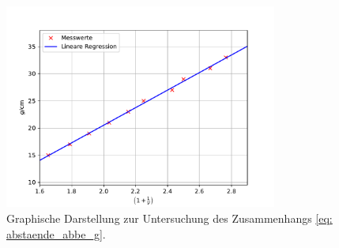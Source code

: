 \begin{figure}
  \centering
  \includegraphics[width = 0.8\textwidth]{../Messdaten/plots/abbe_plot_g.pdf}
  \caption{Graphische Darstellung zur Untersuchung des Zusammenhangs \eqref{eq: abstaende_abbe_g}.} %
  \label{fig: abbe_g}
\end{figure}


